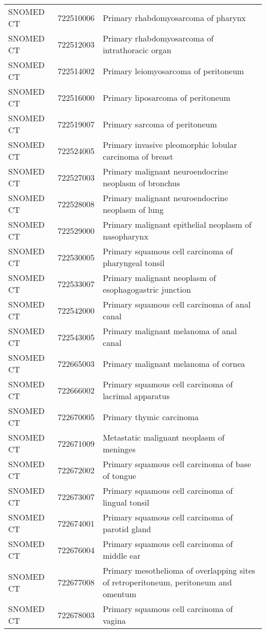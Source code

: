 \begin{longtable}{p{}p{}p{}}
  SNOMED CT & 722510006 & Primary rhabdomyosarcoma of pharynx \\ 
  SNOMED CT & 722512003 & Primary rhabdomyosarcoma of intrathoracic organ \\ 
  SNOMED CT & 722514002 & Primary leiomyosarcoma of peritoneum \\ 
  SNOMED CT & 722516000 & Primary liposarcoma of peritoneum \\ 
  SNOMED CT & 722519007 & Primary sarcoma of peritoneum \\ 
  SNOMED CT & 722524005 & Primary invasive pleomorphic lobular carcinoma of breast \\ 
  SNOMED CT & 722527003 & Primary malignant neuroendocrine neoplasm of bronchus \\ 
  SNOMED CT & 722528008 & Primary malignant neuroendocrine neoplasm of lung \\ 
  SNOMED CT & 722529000 & Primary malignant epithelial neoplasm of nasopharynx \\ 
  SNOMED CT & 722530005 & Primary squamous cell carcinoma of pharyngeal tonsil \\ 
  SNOMED CT & 722533007 & Primary malignant neoplasm of esophagogastric junction \\ 
  SNOMED CT & 722542000 & Primary squamous cell carcinoma of anal canal \\ 
  SNOMED CT & 722543005 & Primary malignant melanoma of anal canal \\ 
  SNOMED CT & 722665003 & Primary malignant melanoma of cornea \\ 
  SNOMED CT & 722666002 & Primary squamous cell carcinoma of lacrimal apparatus \\ 
  SNOMED CT & 722670005 & Primary thymic carcinoma \\ 
  SNOMED CT & 722671009 & Metastatic malignant neoplasm of meninges \\ 
  SNOMED CT & 722672002 & Primary squamous cell carcinoma of base of tongue \\ 
  SNOMED CT & 722673007 & Primary squamous cell carcinoma of lingual tonsil \\ 
  SNOMED CT & 722674001 & Primary squamous cell carcinoma of parotid gland \\ 
  SNOMED CT & 722676004 & Primary squamous cell carcinoma of middle ear \\ 
  SNOMED CT & 722677008 & Primary mesothelioma of overlapping sites of retroperitoneum, peritoneum and omentum \\ 
  SNOMED CT & 722678003 & Primary squamous cell carcinoma of vagina \\ 

\end{longtable}

